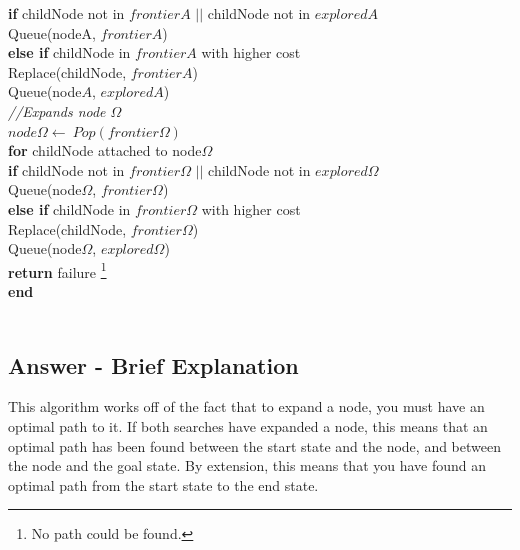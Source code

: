 \documentclass{article}
\begin{document}
\-\hspace{30mm} \textbf{if} childNode not in $frontierA$ $||$ childNode not in $exploredA$ \\
\-\hspace{40mm} Queue(nodeA, $frontierA$) \\
\-\hspace{30mm} \textbf{else if} childNode in $frontierA$ with higher cost\\
\-\hspace{40mm} Replace(childNode, $frontierA$) \\
\-\hspace{20mm} Queue(node$A$, $exploredA$) \\
\-\hspace{20mm} \textit{//Expands node $\Omega$} \\
\-\hspace{20mm} $node\Omega \leftarrow \ Pop(frontier\Omega)$ \\
\-\hspace{20mm} \textbf{for} childNode attached to node$\Omega$ \\
\-\hspace{30mm} \textbf{if} childNode not in $frontier\Omega$ $||$ childNode not in $explored\Omega$ \\
\-\hspace{40mm} Queue(node$\Omega$, $frontier\Omega$) \\
\-\hspace{30mm} \textbf{else if} childNode in $frontier\Omega$ with higher cost\\
\-\hspace{40mm} Replace(childNode, $frontier\Omega$) \\
\-\hspace{20mm} Queue(node$\Omega$, $explored\Omega$) \\
\-\hspace{10mm} \textbf{return} failure \footnote{No path could be found.} \\
\textbf{end}
\\~\\
\newpage
\subsection{Answer - Brief Explanation}
This algorithm works off of the fact that to expand a node, you must have an optimal path to it. If both searches have expanded a node, this means that an optimal path has been found between the start state and the node, and between the node and the goal state. By extension, this means that you have found an optimal path from the start state to the end state.
\end{document}
